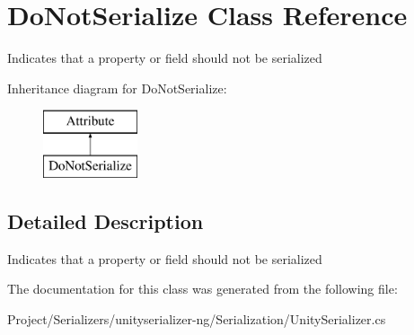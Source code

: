 \hypertarget{class_do_not_serialize}{}\section{Do\+Not\+Serialize Class Reference}
\label{class_do_not_serialize}


Indicates that a property or field should not be serialized  


Inheritance diagram for Do\+Not\+Serialize\+:\begin{figure}[H]
\begin{center}
\leavevmode
\includegraphics[height=2.000000cm]{class_do_not_serialize}
\end{center}
\end{figure}


\subsection{Detailed Description}
Indicates that a property or field should not be serialized 



The documentation for this class was generated from the following file\+:\begin{DoxyCompactItemize}
\item 
Project/\+Serializers/unityserializer-\/ng/\+Serialization/Unity\+Serializer.\+cs\end{DoxyCompactItemize}
